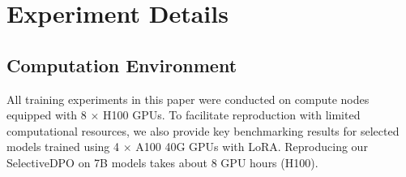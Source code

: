 \clearpage



\clearpage
\section{Experiment Details}
\label{app:experiment_details}
\subsection{Computation Environment}
All training experiments in this paper were conducted on compute nodes equipped with 8 $\times$ H100 GPUs. To facilitate reproduction with limited computational resources, we also provide key benchmarking results for selected models trained using 4 $\times$ A100 40G GPUs with LoRA. Reproducing our SelectiveDPO on 7B models takes about 8 GPU hours (H100).


